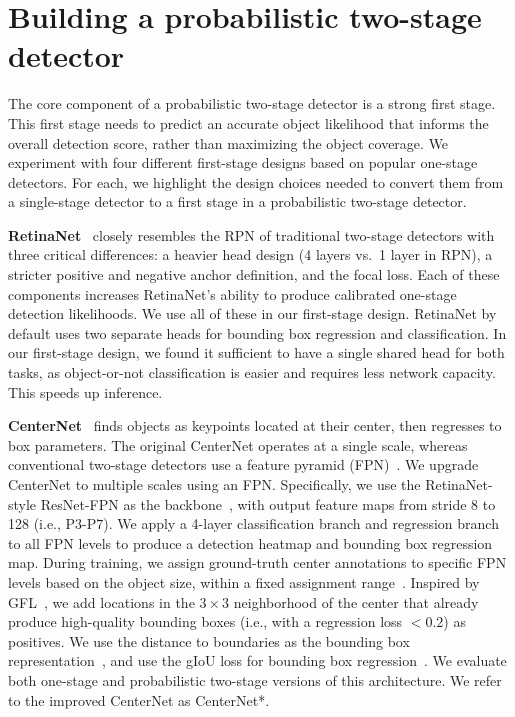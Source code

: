 \documentclass{article}
\newcommand{\lblsec}[1]{\label{sec:#1}}
\begin{document}
\section{Building a probabilistic two-stage detector}
\lblsec{designing}

The core component of a probabilistic two-stage detector is a strong first stage.
This first stage needs to predict an accurate object likelihood that informs the overall detection score, rather than maximizing the object coverage.
We experiment with four different first-stage designs based on popular one-stage detectors.
For each, we highlight the design choices needed to convert them from a single-stage detector to a first stage in a probabilistic two-stage detector.

\textbf{RetinaNet}~\cite{lin2018focal} closely resembles the RPN of traditional two-stage detectors with three critical differences: a heavier head design (4 layers vs.\ 1 layer in RPN), a stricter positive and negative anchor definition, and the focal loss.
Each of these components increases RetinaNet's ability to produce calibrated one-stage detection likelihoods.
We use all of these in our first-stage design.
RetinaNet by default uses two separate heads for bounding box regression and classification.
In our first-stage design, we found it sufficient to have a single shared head for both tasks, as object-or-not classification is easier and requires less network capacity.
This speeds up inference.

\textbf{CenterNet}~\cite{zhou2019objects} finds objects as keypoints located at their center, then regresses to box parameters.
The original CenterNet operates at a single scale,
whereas conventional two-stage detectors use a feature pyramid (FPN)~\cite{lin2017feature}.
We upgrade CenterNet to multiple scales using an FPN.
Specifically, we use the RetinaNet-style ResNet-FPN as the backbone~\cite{lin2018focal}, with output feature maps from stride 8 to 128 (i.e., P$3$-P$7$). 
We apply a 4-layer classification branch and regression branch~\cite{tian2019fcos} to all FPN levels to produce a detection heatmap and bounding box regression map.
During training, we assign ground-truth center annotations to specific FPN levels based on the object size, within a fixed assignment range~\cite{tian2019fcos}. 
Inspired by GFL~\cite{li2020generalized}, we add locations in the $3\times3$ neighborhood of the center that already produce high-quality bounding boxes (i.e., with a regression loss $<0.2$) as positives.
We use the distance to boundaries as the bounding box representation~\cite{tian2019fcos}, and use the gIoU loss for bounding box regression~\cite{rezatofighi2019generalized}.
We evaluate both one-stage and probabilistic two-stage versions of this architecture.
We refer to the improved CenterNet as CenterNet*.
\end{document}
